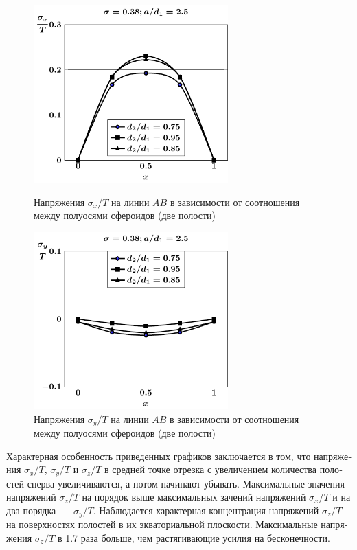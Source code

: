 \begin{russian}
\begin{figure}[h!]
\centering\footnotesize
\parbox[b]{7.5cm}{\centering\includegraphics[width=7.5cm]{cav2-d-sig_x.pdf}
\caption{Напряжения $\sigma_x/T$ на линии $AB$ в зависимости от соотношения между полуосями сфероидов (две полости)
\label{f:9:8}}}\hfil\hfil
\parbox[b]{7.5cm}{\centering\includegraphics[width=7.5cm]{cav2-d-sig_y.pdf}
\caption{Напряжения $\sigma_y/T$ на линии $AB$ в зависимости от соотношения между полуосями сфероидов (две полости)
\label{f:9:9}}}
\end{figure}

%

Характерная особенность приведенных графиков заключается в том, что напряжения $\sigma_x/T$, $\sigma_y/T$ и $\sigma_z/T$ в средней точке отрезка с увеличением количества полостей сперва увеличиваются, а потом начинают убывать. Максимальные значения напряжений $\sigma_z/T$ на порядок выше максимальных зачений напряжений $\sigma_x/T$ и на два порядка~--- $\sigma_y/T$. Наблюдается характерная концентрация напряжений $\sigma_z/T$ на поверхностях полостей в их экваториальной плоскости. Максимальные напряжения $\sigma_z/T$ в 1.7 раза больше, чем растягивающие усилия на бесконечности.


\end{russian}
